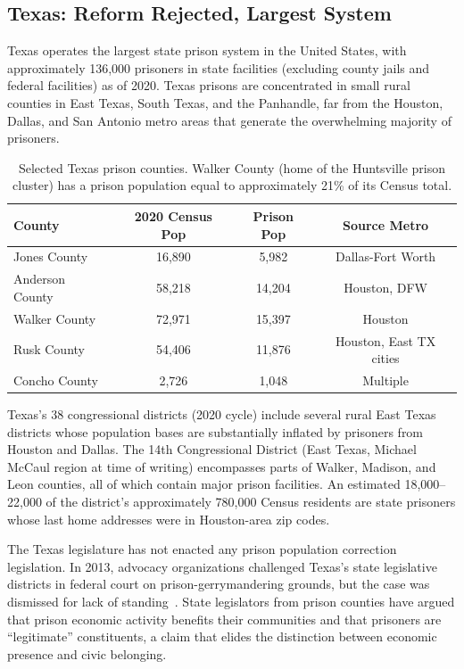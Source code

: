 \subsection{Texas: Reform Rejected, Largest System}

Texas operates the largest state prison system in the United States, with approximately 136,000 prisoners in state facilities (excluding county jails and federal facilities) as of 2020. Texas prisons are concentrated in small rural counties in East Texas, South Texas, and the Panhandle, far from the Houston, Dallas, and San Antonio metro areas that generate the overwhelming majority of prisoners.

\begin{table}[h]
\centering
\begin{tabular}{lccc}
\toprule
\textbf{County} & \textbf{2020 Census Pop} & \textbf{Prison Pop} & \textbf{Source Metro} \\
\midrule
Jones County & 16,890 & 5,982 & Dallas-Fort Worth \\
Anderson County & 58,218 & 14,204 & Houston, DFW \\
Walker County & 72,971 & 15,397 & Houston \\
Rusk County & 54,406 & 11,876 & Houston, East TX cities \\
Concho County & 2,726 & 1,048 & Multiple \\
\bottomrule
\end{tabular}
\caption{Selected Texas prison counties. Walker County (home of the Huntsville prison cluster) has a prison population equal to approximately 21\% of its Census total.}
\label{tab:tx-counties}
\end{table}

Texas's 38 congressional districts (2020 cycle) include several rural East Texas districts whose population bases are substantially inflated by prisoners from Houston and Dallas. The 14th Congressional District (East Texas, Michael McCaul region at time of writing) encompasses parts of Walker, Madison, and Leon counties, all of which contain major prison facilities. An estimated 18,000--22,000 of the district's approximately 780,000 Census residents are state prisoners whose last home addresses were in Houston-area zip codes.

The Texas legislature has not enacted any prison population correction legislation. In 2013, advocacy organizations challenged Texas's state legislative districts in federal court on prison-gerrymandering grounds, but the case was dismissed for lack of standing~\citep{larios2004}. State legislators from prison counties have argued that prison economic activity benefits their communities and that prisoners are ``legitimate'' constituents, a claim that elides the distinction between economic presence and civic belonging.

